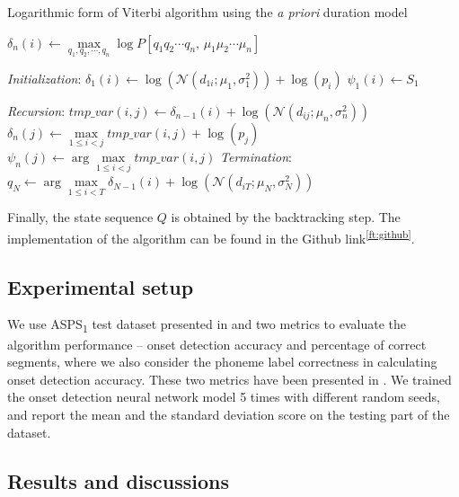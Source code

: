 \begin{algorithm}
\caption{Logarithmic form of Viterbi algorithm using the \textit{a priori} duration model}\label{alg:log_viterbi}
\begin{algorithmic}
\item $\delta_n(i) \gets \max\limits_{q_1,q_2,\cdots,q_n}{\log P[q_1 q_2 \cdots q_n,\, \mu_1 \mu_2 \cdots \mu_n]}$

\BState \emph{Initialization}:
\State $\delta_1(i) \gets \log(\mathcal{N} (d_{1i} ; \mu_1, \sigma_1^2))+\log(p_i)$
\State $\psi_1(i) \gets S_1$

\BState \emph{Recursion}:
\State $tmp\_var(i,j) \gets \delta_{n-1} (i) + \log(\mathcal{N} (d_{ij} ; \mu_n, \sigma_n^2))$
\State $\delta_n (j) \gets \max\limits_{1 \leqslant i < j} tmp\_var(i,j) +\log(p_j)$
\State $\psi_n (j) \gets \arg\max\limits_{1 \leqslant i < j} tmp\_var(i,j)$
\BState \emph{Termination}:
\State $q_{N} \gets \arg\max\limits_{1 \leqslant i < T} {\delta_{N-1} (i) + \log(\mathcal{N} (d_{i T} ; \mu_N, \sigma_N^2))}$
\EndProcedure
\end{algorithmic}
\end{algorithm}

Finally, the state sequence $Q$ is obtained by the backtracking step. The implementation of the algorithm can be found in the Github link\textsuperscript{\ref{ft:github}}.

\subsection{Experimental setup}

We use \gls{ASPS}\textsubscript{1} test dataset presented in  and two metrics to evaluate the algorithm performance -- onset detection accuracy and percentage of correct segments, where we also consider the phoneme label correctness in calculating onset detection accuracy. These two metrics have been presented in . We trained the onset detection neural network model 5 times with different random seeds, and report the mean and the standard deviation score on the testing part of the dataset.

\subsection{Results and discussions}


